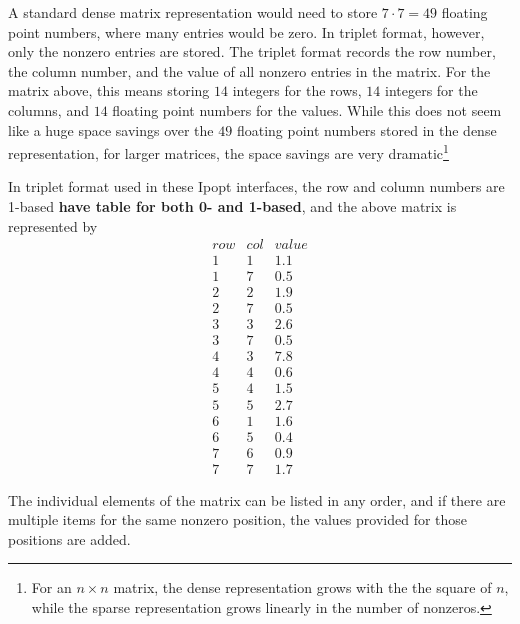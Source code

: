 \documentclass[letter,10pt]{article}
\begin{document}
{A standard dense matrix representation would need to store $7 \cdot
7{=} 49$ floating point numbers, where many entries would be zero. In
triplet format, however, only the nonzero entries are stored. The
triplet format records the row number, the column number, and the
value of all nonzero entries in the matrix. For the matrix above, this
means storing $14$ integers for the rows, $14$ integers for the
columns, and $14$ floating point numbers for the values. While this
does not seem like a huge space savings over the $49$ floating point
numbers stored in the dense representation, for larger matrices, the
space savings are very dramatic\footnote{For an $n \times n$ matrix,
  the dense representation grows with the the square of $n$, while the
  sparse representation grows linearly in the number of nonzeros.}

In triplet format used in these Ipopt interfaces, the row and column
numbers are 1-based {\bf have table for both 0- and 1-based}, and the
above matrix is represented by
\[
\begin{array}{ccc}
row     &       col     &       value \\
1       &       1       &       1.1     \\
1       &       7       &       0.5     \\
2       &       2       &       1.9     \\
2       &       7       &       0.5     \\
3       &       3       &       2.6     \\
3       &       7       &       0.5     \\
4       &       3       &       7.8     \\
4       &       4       &       0.6     \\
5       &       4       &       1.5     \\
5       &       5       &       2.7     \\
6       &       1       &       1.6     \\
6       &       5       &       0.4     \\
7       &       6       &       0.9     \\
7       &       7       &       1.7
\end{array}
\]

The individual elements of the matrix can be listed in any order, and
if there are multiple items for the same nonzero position, the values
provided for those positions are added.

}
\end{document}
